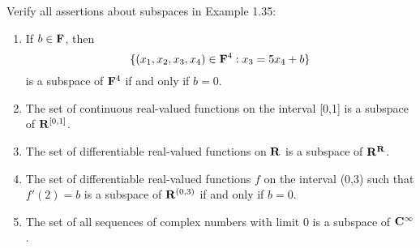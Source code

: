 \begin{exercise}
    Verify all assertions about subspaces in Example 1.35:
    \begin{enumerate}[label=(\alph*)]
        \item If $b \in \mathbf{F}$, then
        $$\{(x_1, x_2, x_3, x_4)\in \mathbf{F}^4 : x_3 = 5x_4 + b\}$$
        is a subspace of $\mathbf{F}^4$ if and only if $b=0$.
        \item The set of continuous real-valued functions on the interval [0,1] is a subspace of $\mathbf{R}^{[0,1]}$.
        \item The set of differentiable real-valued functions on $\mathbf{R}$ is a subspace of $\mathbf{R}^{\mathbf{R}}$.
        \item The set of differentiable real-valued functions $f$ on the interval (0,3) such that $f'(2) = b$ is a subspace of $\mathbf{R}^{(0,3)}$ if and only if $b = 0$.
        \item The set of all sequences of complex numbers with limit 0 is a subspace of $\mathbf{C}^{\infty}$. \\
    \end{enumerate}
\end{exercise}

